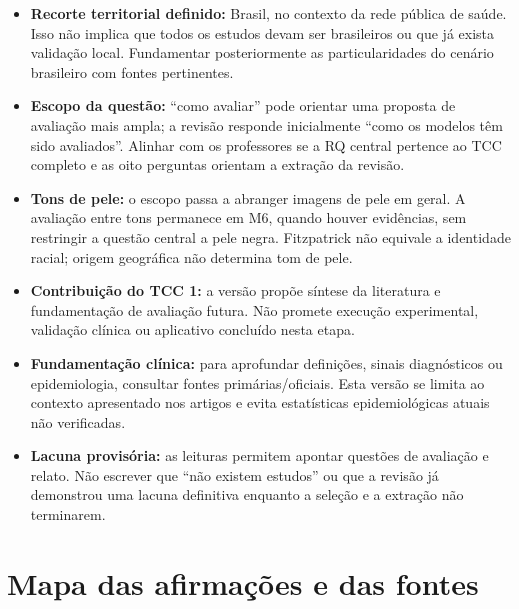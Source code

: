 \begin{itemize}
\tightlist
\item
  \textbf{Recorte territorial definido:} Brasil, no contexto da rede
  pública de saúde. Isso não implica que todos os estudos devam ser
  brasileiros ou que já exista validação local. Fundamentar
  posteriormente as particularidades do cenário brasileiro com fontes
  pertinentes.
\item
  \textbf{Escopo da questão:} ``como avaliar'' pode orientar uma
  proposta de avaliação mais ampla; a revisão responde inicialmente
  ``como os modelos têm sido avaliados''. Alinhar com os professores se
  a RQ central pertence ao TCC completo e as oito perguntas orientam a
  extração da revisão.
\item
  \textbf{Tons de pele:} o escopo passa a abranger imagens de pele em
  geral. A avaliação entre tons permanece em M6, quando houver
  evidências, sem restringir a questão central a pele negra. Fitzpatrick
  não equivale a identidade racial; origem geográfica não determina tom
  de pele.
\item
  \textbf{Contribuição do TCC 1:} a versão propõe síntese da literatura
  e fundamentação de avaliação futura. Não promete execução
  experimental, validação clínica ou aplicativo concluído nesta etapa.
\item
  \textbf{Fundamentação clínica:} para aprofundar definições, sinais
  diagnósticos ou epidemiologia, consultar fontes primárias/oficiais.
  Esta versão se limita ao contexto apresentado nos artigos e evita
  estatísticas epidemiológicas atuais não verificadas.
\item
  \textbf{Lacuna provisória:} as leituras permitem apontar questões de
  avaliação e relato. Não escrever que ``não existem estudos'' ou que a
  revisão já demonstrou uma lacuna definitiva enquanto a seleção e a
  extração não terminarem.
\end{itemize}

\section{Mapa das afirmações e das
fontes}\label{mapa-das-afirmauxe7uxf5es-e-das-fontes}

